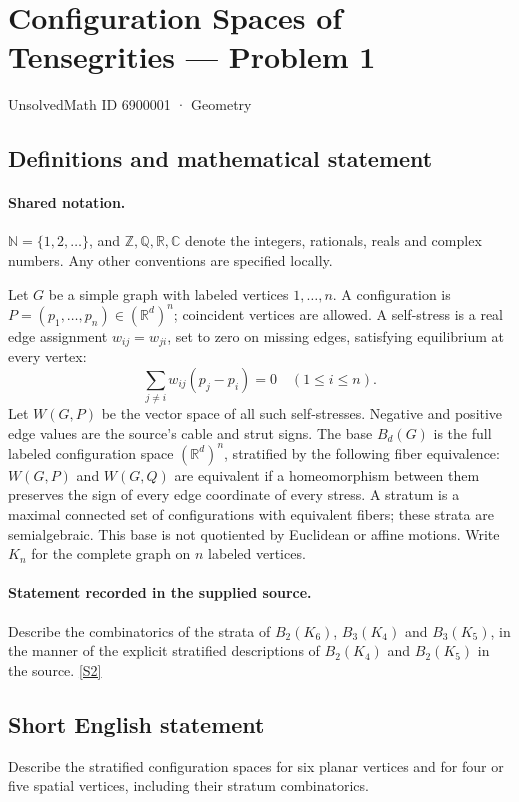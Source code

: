 \documentclass[11pt]{article}
\newcommand{\sref}[2]{\hyperlink{source:#1:#2}{[S#2]}}
\begin{document}
\setcounter{section}{6900000}
\section{Configuration Spaces of Tensegrities — Problem 1}\label{6900001}
{\small\sffamily UnsolvedMath ID 6900001 · Geometry}
\subsection{Definitions and mathematical statement}

\paragraph{Shared notation.}$\mathbb N=\{1,2,\ldots\}$, and $\mathbb Z,\mathbb Q,\mathbb R,\mathbb C$ denote the integers, rationals, reals and complex numbers. Any other conventions are specified locally.


Let $G$ be a simple graph with labeled vertices $1,\ldots,n$. A configuration is $P=(p_1,\ldots,p_n)\in(\mathbb R^d)^n$; coincident vertices are allowed. A self-stress is a real edge assignment $w_{ij}=w_{ji}$, set to zero on missing edges, satisfying equilibrium at every vertex:
\[\sum_{j\ne i}w_{ij}(p_j-p_i)=0\quad(1\leq i\leq n).\]
Let $W(G,P)$ be the vector space of all such self-stresses. Negative and positive edge values are the source’s cable and strut signs. The base $B_d(G)$ is the full labeled configuration space $(\mathbb R^d)^n$, stratified by the following fiber equivalence: $W(G,P)$ and $W(G,Q)$ are equivalent if a homeomorphism between them preserves the sign of every edge coordinate of every stress. A stratum is a maximal connected set of configurations with equivalent fibers; these strata are semialgebraic. This base is not quotiented by Euclidean or affine motions. Write $K_n$ for the complete graph on $n$ labeled vertices.
\paragraph{Statement recorded in the supplied source.}
Describe the combinatorics of the strata of $B_2(K_6)$, $B_3(K_4)$ and $B_3(K_5)$, in the manner of the explicit stratified descriptions of $B_2(K_4)$ and $B_2(K_5)$ in the source. \sref{6900001}{2}
\subsection{Short English statement}
Describe the stratified configuration spaces for six planar vertices and for four or five spatial vertices, including their stratum combinatorics.
\end{document}
